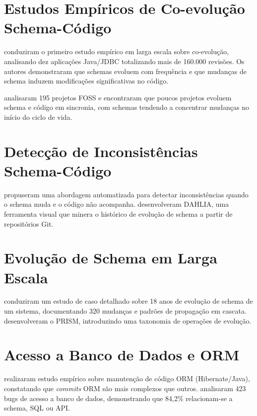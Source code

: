 \documentclass[
  12pt,
  openright,
  oneside,
  a4paper,
  brazil
]{abntex2}
\begin{document}

\section{Estudos Empíricos de Co-evolução Schema-Código}

 conduziram o primeiro estudo empírico em larga escala sobre co-evolução, analisando dez aplicações Java/JDBC totalizando mais de 160.000 revisões. Os autores demonstraram que schemas evoluem com frequência e que mudanças de schema induzem modificações significativas no código.

 analisaram 195 projetos FOSS e encontraram que poucos projetos evoluem schema e código em sincronia, com schemas tendendo a concentrar mudanças no início do ciclo de vida.

\section{Detecção de Inconsistências Schema-Código}

 propuseram uma abordagem automatizada para detectar inconsistências quando o schema muda e o código não acompanha.  desenvolveram DAHLIA, uma ferramenta visual que minera o histórico de evolução de schema a partir de repositórios Git.

\section{Evolução de Schema em Larga Escala}

 conduziram um estudo de caso detalhado sobre 18 anos de evolução de schema de um sistema, documentando 320 mudanças e padrões de propagação em cascata.  desenvolveram o PRISM, introduzindo uma taxonomia de operações de evolução.

\section{Acesso a Banco de Dados e ORM}

 realizaram estudo empírico sobre manutenção de código ORM (Hibernate/Java), constatando que \textit{commits} ORM são mais complexos que outros.  analisaram 423 bugs de acesso a banco de dados, demonstrando que 84,2\% relacionam-se a schema, SQL ou API.
\end{document}
